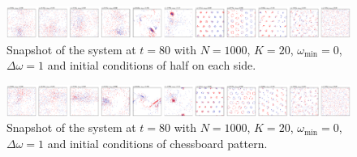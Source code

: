\documentclass{article}
\begin{document}
\begin{figure}[H]
    \centering
    \includegraphics[width=\textwidth]{./figs/HalfInitPhaseLagPatternFormation_a0.00_Do1_aN1000_distuniform.pdf}
    \caption{
        \label{fig:half}
        Snapshot of the system at $t=80$ with $N=1000$, $K=20$, $\omega _{\min}=0$, $\Delta \omega=1$ and initial conditions of half on each side.
    }
\end{figure}

\begin{figure}[H]
    \centering
    \includegraphics[width=\textwidth]{./figs/ChessboardPhaseLagPatternFormation_a0.00_Do1_aN1000_distuniform.pdf}
    \caption{
        \label{fig:chess}
        Snapshot of the system at $t=80$ with $N=1000$, $K=20$, $\omega _{\min}=0$, $\Delta \omega=1$ and initial conditions of chessboard pattern.
    }
\end{figure}

\newpage


\end{document}
